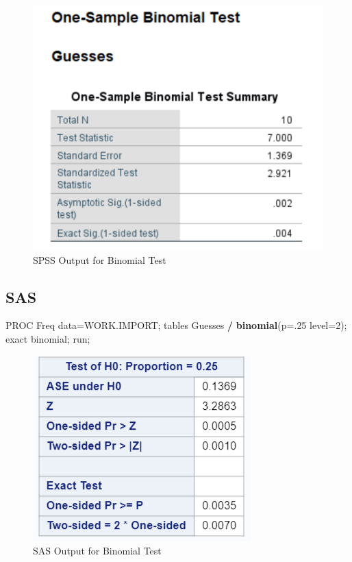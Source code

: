 \documentclass[
]{book}
\newenvironment{Shaded}{\begin{snugshade}}{\end{snugshade}}
\newcommand{\DataTypeTok}[1]{\textcolor[rgb]{0.13,0.29,0.53}{#1}}
\newcommand{\DecValTok}[1]{\textcolor[rgb]{0.00,0.00,0.81}{#1}}
\newcommand{\KeywordTok}[1]{\textcolor[rgb]{0.13,0.29,0.53}{\textbf{#1}}}
\newcommand{\NormalTok}[1]{#1}
\newcommand{\OperatorTok}[1]{\textcolor[rgb]{0.81,0.36,0.00}{\textbf{#1}}}
\newcommand{\StringTok}[1]{\textcolor[rgb]{0.31,0.60,0.02}{#1}}
\begin{document}
\begin{figure}[!h]
\includegraphics{Screenshots/Binomial Test/BinomialTestSPSS} \caption{\label{fig:BinomialTestSPSS}SPSS Output for Binomial Test}\label{fig:BinomialTestSPSS}
\end{figure}

\hypertarget{sas}{%
\subsection{SAS}\label{sas}}

\begin{Shaded}
\begin{Highlighting}[]
\NormalTok{PROC Freq data=WORK.IMPORT;}
\NormalTok{	tables Guesses }\OperatorTok{/}\StringTok{ }\KeywordTok{binomial}\NormalTok{(}\DataTypeTok{p=}\NormalTok{.}\DecValTok{25} \DataTypeTok{level=}\DecValTok{2}\NormalTok{);}
\NormalTok{	exact binomial;}
\NormalTok{run;}
\end{Highlighting}
\end{Shaded}

\begin{figure}[!h]
\includegraphics{Screenshots/Binomial Test/BinomialTestSAS} \caption{\label{fig:BinomialTestSAS}SAS Output for Binomial Test}\label{fig:BinomialTestSAS}
\end{figure}
\end{document}
